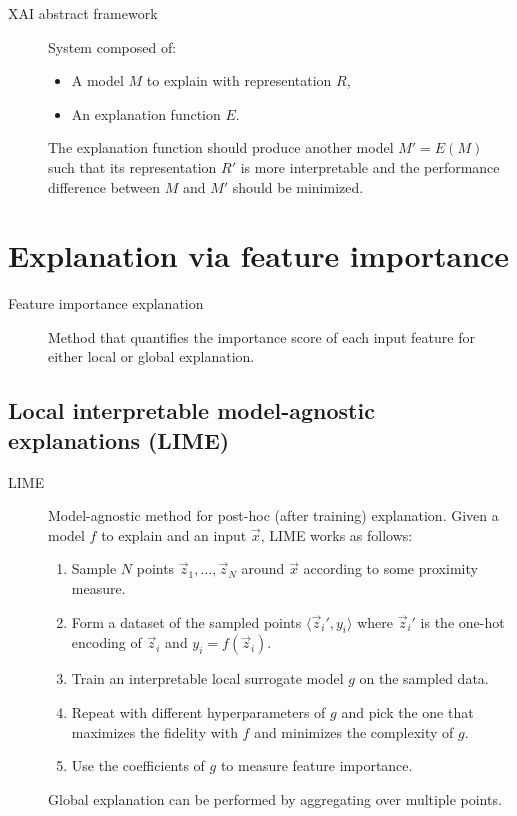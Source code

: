 \begin{description}
    \item[XAI abstract framework] 
        System composed of:
        \begin{itemize}
            \item A model $M$ to explain with representation $R$,
            \item An explanation function $E$.
        \end{itemize}
        The explanation function should produce another model $M' = E(M)$ such that its representation $R'$ is more interpretable and the performance difference between $M$ and $M'$ should be minimized.
\end{description}



\section{Explanation via feature importance}


\begin{description}
    \item[Feature importance explanation] 
        Method that quantifies the importance score of each input feature for either local or global explanation.
\end{description}


\subsection{Local interpretable model-agnostic explanations (LIME)}

\begin{description}
    \item[LIME] 
        Model-agnostic method for post-hoc (after training) explanation. Given a model $f$ to explain and an input $\vec{x}$, LIME works as follows:
        \begin{enumerate}
            \item Sample $N$ points $\vec{z}_1, \dots, \vec{z}_N$ around $\vec{x}$ according to some proximity measure.
            \item Form a dataset of the sampled points $\langle \vec{z}_i', y_i \rangle$ where $\vec{z}_i'$ is the one-hot encoding of $\vec{z}_i$ and $y_i = f(\vec{z}_i)$.
            \item Train an interpretable local surrogate model $g$ on the sampled data.
            \item Repeat with different hyperparameters of $g$ and pick the one that maximizes the fidelity with $f$ and minimizes the complexity of $g$.
            \item Use the coefficients of $g$ to measure feature importance.
        \end{enumerate}

        \begin{remark}
            Global explanation can be performed by aggregating over multiple points.
        \end{remark}
\end{description}



